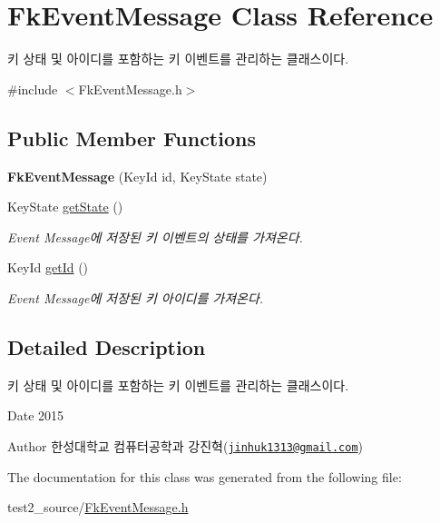 \hypertarget{class_fk_event_message}{}\section{Fk\+Event\+Message Class Reference}
\label{class_fk_event_message}


키 상태 및 아이디를 포함하는 키 이벤트를 관리하는 클래스이다.  




{\ttfamily \#include $<$Fk\+Event\+Message.\+h$>$}

\subsection*{Public Member Functions}
\begin{DoxyCompactItemize}
\item 
\hypertarget{class_fk_event_message_ad505aa215872353aee3a1f1e9a38418a}{}{\bfseries Fk\+Event\+Message} (Key\+Id id, Key\+State state)\label{class_fk_event_message_ad505aa215872353aee3a1f1e9a38418a}

\item 
\hypertarget{class_fk_event_message_a6a98e1881c13c365e363e6889fb51985}{}Key\+State \hyperlink{class_fk_event_message_a6a98e1881c13c365e363e6889fb51985}{get\+State} ()\label{class_fk_event_message_a6a98e1881c13c365e363e6889fb51985}

\begin{DoxyCompactList}\small\item\em Event Message에 저장된 키 이벤트의 상태를 가져온다. \end{DoxyCompactList}\item 
\hypertarget{class_fk_event_message_ac0b7abb9132d1e5ac34098f039746068}{}Key\+Id \hyperlink{class_fk_event_message_ac0b7abb9132d1e5ac34098f039746068}{get\+Id} ()\label{class_fk_event_message_ac0b7abb9132d1e5ac34098f039746068}

\begin{DoxyCompactList}\small\item\em Event Message에 저장된 키 아이디를 가져온다. \end{DoxyCompactList}\end{DoxyCompactItemize}


\subsection{Detailed Description}
키 상태 및 아이디를 포함하는 키 이벤트를 관리하는 클래스이다. 

\begin{DoxyDate}{Date}
2015 
\end{DoxyDate}
\begin{DoxyAuthor}{Author}
한성대학교 컴퓨터공학과 강진혁(\href{mailto:jinhuk1313@gmail.com}{\tt jinhuk1313@gmail.\+com}) 
\end{DoxyAuthor}


The documentation for this class was generated from the following file\+:\begin{DoxyCompactItemize}
\item 
test2\+\_\+source/\hyperlink{_fk_event_message_8h}{Fk\+Event\+Message.\+h}\end{DoxyCompactItemize}
